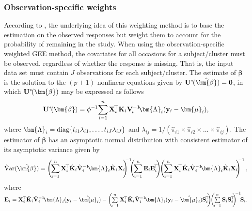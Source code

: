 \subsubsection{Observation-specific weights}
According to \cite{FLW11}, the underlying idea of this weighting method is to base the estimation on the observed responses but weight them to account for the probability of remaining in the study. When using the observation-specific weighted GEE method, the covariates for all occasions for a subject/cluster must be observed, regardless of whether the response is missing. That is, the input data set must contain $J$ observations for each subject/cluster.
The estimate of $\bm{\beta}$ is the solution to the $(p+1)$ nonlinear equations given by ${\bf U}^*\!(\hat{\bm{\beta}})={\bf 0}$, in which ${\bf U}^*\!(\bm{\beta})$ may be expressed as follows
\begin{equation*}
{\bf U}^*\!(\bm{\beta})=\phi^{-1}\!\sum\limits_{i=1}^n{\bf X}_i^{\!\top}{\bf K}_i{\bf V}_{\!i}^{-1}\!\bm{\Lambda}_i({\bf y}_i-\bm{\mu}_i),
\end{equation*}
where $\bm{\Lambda}_i={\rm diag}\{t_{i1}\lambda_{i1},\ldots,t_{iJ}\lambda_{iJ}\}$ and $\lambda_{ij}=1\!/\!(\hat{\pi}_{i1}\times\hat{\pi}_{i2}\times\ldots\times\hat{\pi}_{ij})$. The estimator of $\bm{\beta}$ has an asymptotic normal distribution with consistent estimator of its asymptotic variance given by \citep{RRZ95,PLR02}
$${\rm \hat{V}ar}(\hat{\bm{\beta}})=\left(\!\sum\limits_{i=1}^n {\bf X}_i^{\!\top}\hat{\bf K}_i\hat{\bf V}_i^{-1}\!\bm{\Lambda}_i\hat{\bf K}_i{\bf X}_i\!\!\right)^{\!\!\!-1}\!\!\!\left(\!\sum\limits_{i=1}^n {\bf E}_i{\bf E}_i^{\!\top}\!\!\right)\!\!\left(\!\sum\limits_{i=1}^n {\bf X}_i^{\!\top}\hat{\bf K}_i\hat{\bf V}_i^{-1}\!\bm{\Lambda}_i\hat{\bf K}_i{\bf X}_i\!\!\right)^{\!\!\!-1},$$
where ${\bf E}_i={\bf X}_i^{\!\top}\hat{\bf K}_i\hat{\bf V}_i^{-1}\!\bm{\Lambda}_i({\bf y}_i-\hat{\bm{\mu}}_i)-\left(\!\sum\limits_{i=1}^n {\bf X}_i^{\!\top}\hat{\bf K}_i\hat{\bf V}_i^{-1}\!\bm{\Lambda}_i({\bf y}_i-\hat{\bm{\mu}}_i){\bf S}_i^{\!\top}\!\!\right)\!\!\left(\!\sum\limits_{i=1}^n {\bf S}_i{\bf S}_i^{\!\top}\!\!\right)^{\!\!-1}\!\!{\bf S}_i.$\\

